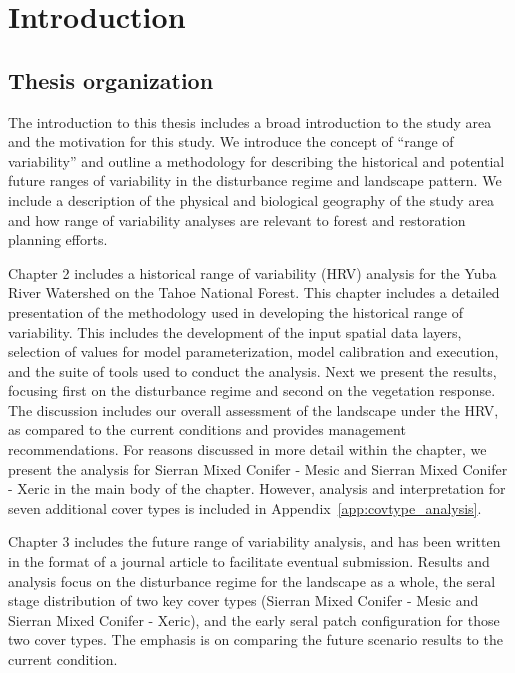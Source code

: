 
\chapter{Introduction} %
\label{CH1}

\section{Thesis organization}

The introduction to this thesis includes a broad introduction to the study area and the motivation for this study. We introduce the concept of ``range of variability'' and outline a methodology for describing the historical and potential future ranges of variability in the disturbance regime and landscape pattern. We include a description of the physical and biological geography of the study area and how range of variability analyses are relevant to forest and restoration planning efforts. 

Chapter 2 includes a historical range of variability (HRV) analysis for the Yuba River Watershed on the Tahoe National Forest. This chapter includes a detailed presentation of the methodology used in developing the historical range of variability. This includes the development of the input spatial data layers, selection of values for model parameterization, model calibration and execution, and the suite of tools used to conduct the analysis. Next we present the results, focusing first on the disturbance regime and second on the vegetation response. The discussion includes our overall assessment of the landscape under the HRV, as compared to the current conditions and provides management recommendations. For reasons discussed in more detail within the chapter, we present the analysis for Sierran Mixed Conifer - Mesic and Sierran Mixed Conifer - Xeric in the main body of the chapter. However, analysis and interpretation for seven additional cover types is included in Appendix~\ref{app:covtype_analysis}. 

Chapter 3 includes the future range of variability analysis, and has been written in the format of a journal article to facilitate eventual submission. Results and analysis focus on the disturbance regime for the landscape as a whole, the seral stage distribution of two key cover types (Sierran Mixed Conifer - Mesic and Sierran Mixed Conifer - Xeric), and the early seral patch configuration for those two cover types. The emphasis is on comparing the future scenario results to the current condition.





